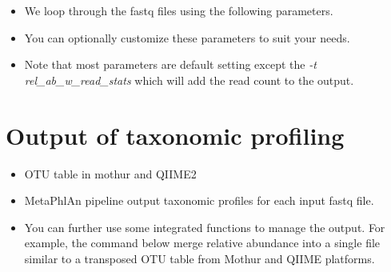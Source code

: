\documentclass[
  12pt,
  openany]{book}
\newenvironment{Shaded}{\begin{snugshade}}{\end{snugshade}}
\newcommand{\AttributeTok}[1]{\textcolor[rgb]{0.77,0.63,0.00}{#1}}
\newcommand{\ControlFlowTok}[1]{\textcolor[rgb]{0.13,0.29,0.53}{\textbf{#1}}}
\newcommand{\DataTypeTok}[1]{\textcolor[rgb]{0.13,0.29,0.53}{#1}}
\newcommand{\ExtensionTok}[1]{#1}
\newcommand{\KeywordTok}[1]{\textcolor[rgb]{0.13,0.29,0.53}{\textbf{#1}}}
\newcommand{\NormalTok}[1]{#1}
\newcommand{\OperatorTok}[1]{\textcolor[rgb]{0.81,0.36,0.00}{\textbf{#1}}}
\newcommand{\PreprocessorTok}[1]{\textcolor[rgb]{0.56,0.35,0.01}{\textit{#1}}}
\newcommand{\VariableTok}[1]{\textcolor[rgb]{0.00,0.00,0.00}{#1}}
\providecommand{\tightlist}{%
  \setlength{\itemsep}{0pt}\setlength{\parskip}{0pt}}
\begin{document}
\begin{itemize}
\tightlist
\item
  We loop through the fastq files using the following parameters.
\item
  You can optionally customize these parameters to suit your needs.
\item
  Note that most parameters are default setting except the \emph{-t rel\_ab\_w\_read\_stats} which will add the read count to the output.
\end{itemize}

\begin{Shaded}
\end{Shaded}

\hypertarget{output-of-taxonomic-profiling}{%
\section{Output of taxonomic profiling}\label{output-of-taxonomic-profiling}}

\begin{itemize}
\tightlist
\item
  OTU table in mothur and QIIME2
\item
  MetaPhlAn pipeline output taxonomic profiles for each input fastq file.
\item
  You can further use some integrated functions to manage the output. For example, the command below merge relative abundance into a single file similar to a transposed OTU table from Mothur and QIIME platforms.
\end{itemize}
\end{document}
